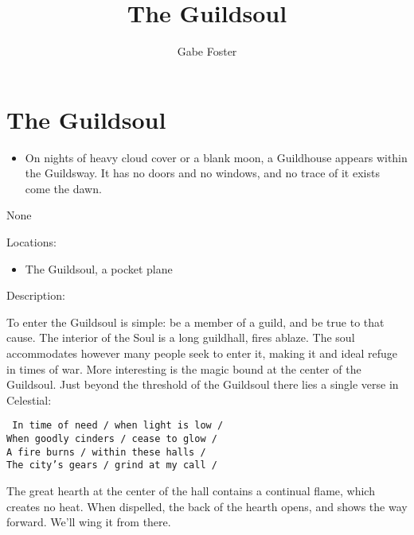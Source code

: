 \documentclass[11pt]{article}
\theoremstyle{definition}
\theoremstyle{remark}
\begin{document}
	\title{The Guildsoul}
	\date{\vspace{-24pt}}
	\author{Gabe Foster}
	\maketitle

\section{The Guildsoul}

\begin{description}

\item[Hooks:] 

\begin{itemize}

\item{On nights of heavy cloud cover or a blank moon, a Guildhouse appears within the Guildsway. It has no doors and no windows, and no trace of it exists come the dawn.}

\end{itemize}

\item[NPCs:]
\begin{description}

\item[None]

\end{description}

\item{Locations:}

\begin{itemize}

\item{The Guildsoul, a pocket plane}

\end{itemize}

\item{Description:}

To enter the Guildsoul is simple: be a member of a guild, and be true to that cause.  The interior of the Soul is a long guildhall, fires ablaze.  The soul accommodates however many people seek to enter it, making it and ideal refuge in times of war.  More interesting is the magic bound at the center of the Guildsoul. Just beyond the threshold of the Guildsoul there lies a single verse in Celestial:

\texttt{
In time of need / when light is low / \\
When goodly cinders / cease to glow / \\
A fire burns / within these halls / \\
The city's gears / grind at my call / \\
}

The great hearth at the center of the hall contains a continual flame, which creates no heat. When dispelled, the back of the hearth opens, and shows the way forward.  We'll wing it from there.

\end{description}
\end{document}
